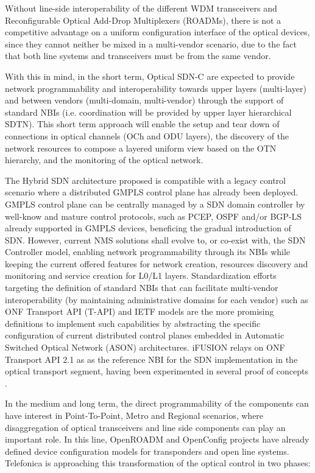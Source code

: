 \documentclass[a4paper,fleqn]{cas-dc}
\begin{document}
Without line-side interoperability of the different WDM transceivers and Reconfigurable Optical Add-Drop Multiplexers (ROADMs), there is not a competitive advantage on a uniform configuration interface of the optical devices, since they cannot neither be mixed in a multi-vendor scenario, due to the fact that both line systems and transceivers must be from the same vendor.

With this in mind, in the short term, Optical SDN-C are expected to provide network programmability and interoperability towards upper layers (multi-layer) and between vendors (multi-domain, multi-vendor) through the support of standard NBIs (i.e. coordination will be provided by upper layer hierarchical SDTN). This short term approach will enable the setup and tear down of connections in optical channels (OCh and ODU layers), the discovery of the network resources to compose a layered uniform view based on the OTN hierarchy, and the monitoring of the optical network.

The Hybrid SDN architecture proposed is compatible with a legacy control scenario where a distributed GMPLS control plane has already been deployed. GMPLS control plane can be centrally managed by a SDN domain controller by well-know and mature control protocols, such as PCEP, OSPF and/or BGP-LS already supported in GMPLS devices, beneficing the gradual introduction of SDN. However, current NMS solutions shall evolve to, or co-exist with, the SDN Controller model, enabling network programmability through its NBIs while keeping the current offered features for network creation, resources discovery and monitoring and service creation for L0/L1 layers. Standardization efforts targeting the definition of standard NBIs that can facilitate multi-vendor interoperability (by maintaining administrative domains for each vendor) such as ONF Transport API (T-API) \cite{lopez2016transport} and IETF models \cite{wu2017service} are the more promising definitions to implement such capabilities by abstracting the specific configuration of current distributed control planes embedded in Automatic Switched Optical Network (ASON) architectures. 
i\uppercase{FUSION} relays on ONF Transport API 2.1 as as the reference NBI for the SDN implementation in the optical transport segment, having been experimented in several proof of concepts \cite{mayoral2016first,mayoral2017control,bravalheri2019vnf}. 

In the medium and long term, the direct programmability of the components can have interest in Point-To-Point, Metro and Regional scenarios, where disaggregation of optical transceivers and line side components can play an important role. In this line, OpenROADM \cite{oda2016learning,kundrat2019opening} and OpenConfig \cite{shaikhopenconfig} projects have already defined device configuration models for transponders and open line systems. Telefonica is approaching this transformation of the optical control in two phases:
\end{document}
